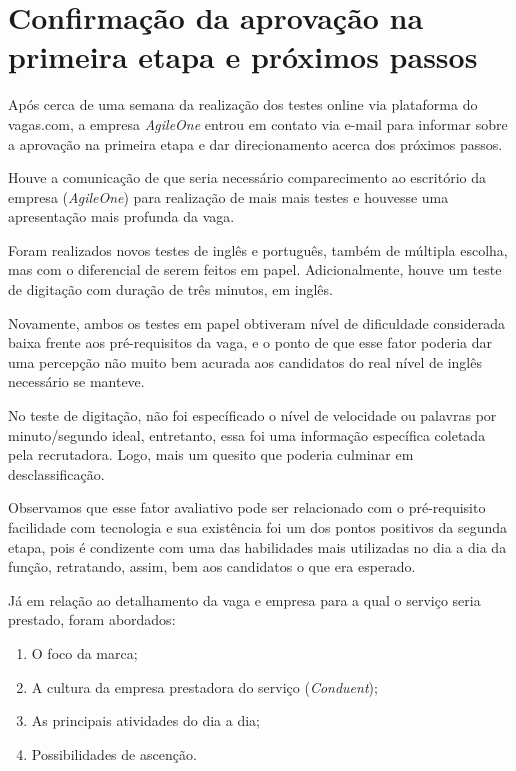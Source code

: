 \documentclass[12pt]{article}
\begin{document}
\section{Confirmação da aprovação na primeira etapa e próximos passos}

Após cerca de uma semana da realização dos testes online via plataforma do vagas.com, a empresa \emph {AgileOne} entrou em contato via e-mail para informar sobre a aprovação na primeira etapa e dar direcionamento acerca dos próximos passos. 

Houve a comunicação de que seria necessário comparecimento ao escritório da empresa (\emph {AgileOne}) para realização de mais mais testes e houvesse uma apresentação mais profunda da vaga.

Foram realizados novos testes de inglês e português, também de múltipla escolha, mas com o diferencial de serem feitos em papel. Adicionalmente, houve um teste de digitação com duração de três minutos, em inglês. 

Novamente, ambos os testes em papel obtiveram nível de dificuldade considerada baixa frente aos pré-requisitos da vaga, e o ponto de que esse fator poderia dar uma percepção não muito bem acurada aos candidatos do real nível de inglês necessário se manteve. 

No teste de digitação, não foi específicado o nível de velocidade ou palavras por minuto/segundo ideal, entretanto, essa foi uma informação específica coletada pela recrutadora. Logo, mais um quesito que poderia culminar em desclassificação. 

Observamos que esse fator avaliativo pode ser relacionado com o pré-requisito facilidade com tecnologia e sua existência foi um dos pontos positivos da segunda etapa, pois é condizente com uma das habilidades mais utilizadas no dia a dia da função, retratando, assim, bem aos candidatos o que era esperado. 

Já em relação ao detalhamento da vaga e empresa para a qual o serviço seria prestado, foram abordados: 

\begin{enumerate}
   	\item O foco da marca;
	\item A cultura da empresa prestadora do serviço (\emph{Conduent});
   	\item As principais atividades do dia a dia; 
   	\item Possibilidades de ascenção. 
\end{enumerate}
\end{document}
